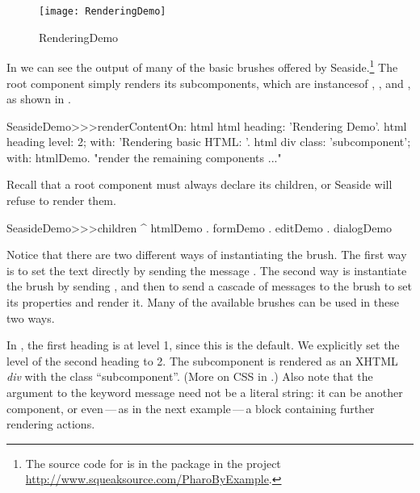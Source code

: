 \documentclass[a4paper,10pt,twoside]{book}
\begin{document}
\begin{figure}[ht]
\begin{center}
\texttt{[image: RenderingDemo]}
\caption{RenderingDemo}
\end{center}
\end{figure}

In  we can see the output of many of the basic brushes offered by
Seaside.\footnote{The source code for  is in the package
 in the project \url{http://www.squeaksource.com/PharoByExample}.}
The root component  simply renders its subcomponents, which are instancesof , ,  and
, as shown in .

\needspace{7ex}
\begin{method}[renderdemo]{}
SeasideDemo>>>renderContentOn: html
	html heading: 'Rendering Demo'.
	html heading
		level: 2;
		with: 'Rendering basic HTML: '.
	html div
		class: 'subcomponent';
		with: htmlDemo.
	"render the remaining components ..."
\end{method}

\noindent
Recall that a root component must always declare its children, or Seaside will refuse to
render them.
\begin{code}{}
SeasideDemo>>>children
	^ { htmlDemo . formDemo . editDemo . dialogDemo }
\end{code}

Notice that there are two different ways of instantiating the  brush.
The first way is to set the text directly by sending the message .
The second way is instantiate the brush by sending , and then to send a
cascade of messages to the brush to set its properties and render it.
Many of the available brushes can be used in these two ways.



In , the first heading is at level 1, since this is the default.
We explicitly set the level of the second heading to 2.
The subcomponent is rendered as an XHTML \emph{div} with the  class
``subcomponent''.
(More on CSS in .)
Also note that the argument to the  keyword message need not be a literal
string: it can be another component, or even\,---\,as in the next example\,---\,a block
containing further rendering actions.
\end{document}
